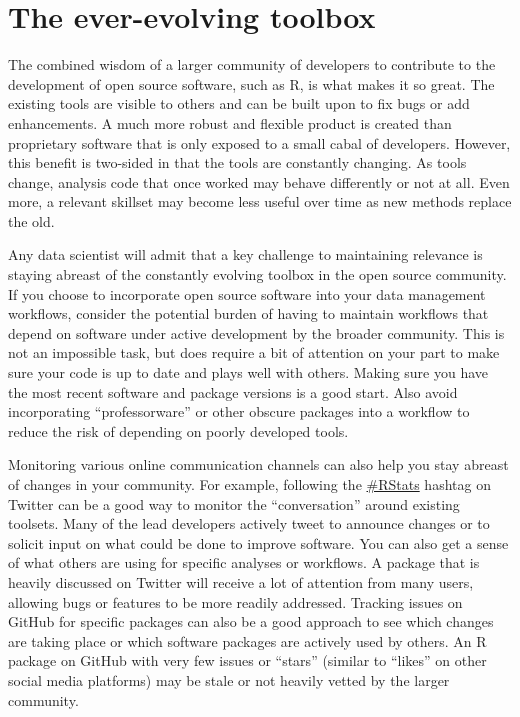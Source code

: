 \documentclass[
]{book}
\begin{document}
\hypertarget{the-ever-evolving-toolbox}{%
\section{The ever-evolving toolbox}\label{the-ever-evolving-toolbox}}

The combined wisdom of a larger community of developers to contribute to the development of open source software, such as R, is what makes it so great. The existing tools are visible to others and can be built upon to fix bugs or add enhancements. A much more robust and flexible product is created than proprietary software that is only exposed to a small cabal of developers. However, this benefit is two-sided in that the tools are constantly changing. As tools change, analysis code that once worked may behave differently or not at all. Even more, a relevant skillset may become less useful over time as new methods replace the old.

Any data scientist will admit that a key challenge to maintaining relevance is staying abreast of the constantly evolving toolbox in the open source community. If you choose to incorporate open source software into your data management workflows, consider the potential burden of having to maintain workflows that depend on software under active development by the broader community. This is not an impossible task, but does require a bit of attention on your part to make sure your code is up to date and plays well with others. Making sure you have the most recent software and package versions is a good start. Also avoid incorporating ``professorware'' or other obscure packages into a workflow to reduce the risk of depending on poorly developed tools.

Monitoring various online communication channels can also help you stay abreast of changes in your community. For example, following the \href{https://twitter.com/hashtag/rstats}{\#RStats} hashtag on Twitter can be a good way to monitor the ``conversation'' around existing toolsets. Many of the lead developers actively tweet to announce changes or to solicit input on what could be done to improve software. You can also get a sense of what others are using for specific analyses or workflows. A package that is heavily discussed on Twitter will receive a lot of attention from many users, allowing bugs or features to be more readily addressed. Tracking issues on GitHub for specific packages can also be a good approach to see which changes are taking place or which software packages are actively used by others. An R package on GitHub with very few issues or ``stars'' (similar to ``likes'' on other social media platforms) may be stale or not heavily vetted by the larger community.
\end{document}
